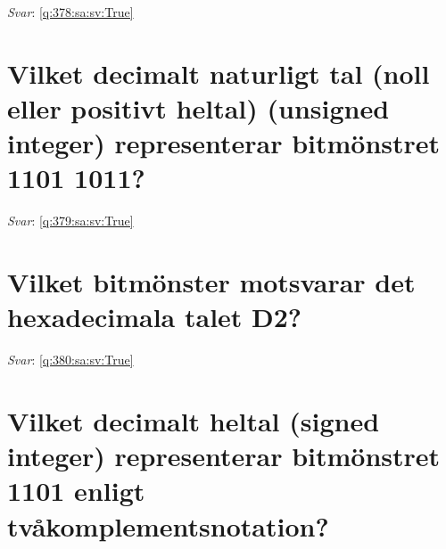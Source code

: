 \documentclass[a4paper,11pt,oneside]{book}
\begin{document}
\begin{sloppypar}
\label{q:378:sa:sv:False}

\vspace{2cm}

\noindent\makebox[\textwidth]{\hrulefill}

\vspace{1cm}

\textit{Svar}: \autoref{q:378:sa:sv:True}



\section{Vilket decimalt naturligt tal (noll eller positivt heltal) (unsigned integer) representerar bitm\"onstret 1101 1011?}

\label{q:379:sa:sv:False}

\vspace{2cm}

\noindent\makebox[\textwidth]{\hrulefill}

\vspace{1cm}

\textit{Svar}: \autoref{q:379:sa:sv:True}



\section{Vilket bitm\"onster motsvarar det hexadecimala talet D2?}

\label{q:380:sa:sv:False}

\vspace{2cm}

\noindent\makebox[\textwidth]{\hrulefill}

\vspace{1cm}

\textit{Svar}: \autoref{q:380:sa:sv:True}



\section{Vilket decimalt heltal (signed integer) representerar bitm\"onstret 1101 enligt tv\r{a}komplementsnotation?}

\label{q:381:sa:sv:False}

\vspace{2cm}

\noindent\makebox[\textwidth]{\hrulefill}

\vspace{1cm}


\end{sloppypar}
\end{document}

